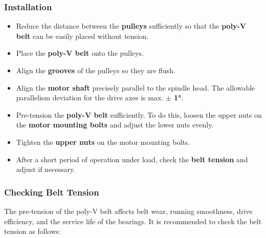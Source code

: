 \subsubsection*{Installation}

\begin{itemize}
    \item Reduce the distance between the \textbf{pulleys} sufficiently so that the \textbf{poly-V belt} can be easily placed without tension.
    \item Place the \textbf{poly-V belt} onto the pulleys.
    \item Align the \textbf{grooves} of the pulleys so they are flush.
    \item Align the \textbf{motor shaft} precisely parallel to the spindle head.  
          The allowable parallelism deviation for the drive axes is max. \textbf{$\pm$ 1°}.
    \item Pre-tension the \textbf{poly-V belt} sufficiently.  
          To do this, loosen the upper nuts on the \textbf{motor mounting bolts} and adjust the lower nuts evenly.
\end{itemize}


\begin{itemize}
    \item Tighten the \textbf{upper nuts} on the motor mounting bolts.
    \item After a short period of operation under load, check the \textbf{belt tension} and adjust if necessary.
\end{itemize}

\subsubsection*{Checking Belt Tension}

The pre-tension of the poly-V belt affects belt wear, running smoothness, drive efficiency, and the service life of the bearings.  
It is recommended to check the belt tension as follows:

